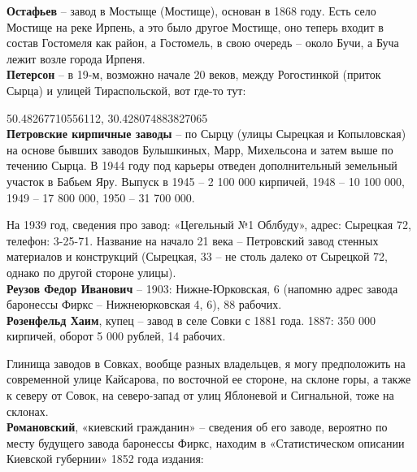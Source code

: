 \noindent\textbf{Остафьев} – завод в Мостыще (Мостище), основан в 1868 году. Есть село Мостище на реке Ирпень, а это было другое Мостище, оно теперь входит в состав Гостомеля как район, а Гостомель, в свою очередь – около Бучи, а Буча лежит возле города Ирпеня.\\


\noindent\textbf{Петерсон} – в 19-м, возможно начале 20 веков, между Рогостинкой (приток Сырца) и улицей Тираспольской, вот где-то тут:

50.48267710556112, 30.428074883827065\\

\noindent\textbf{Петровские кирпичные заводы} – по Сырцу (улицы Сырецкая и Копыловская) на основе бывших заводов Булышкиных, Марр, Михельсона и затем выше по течению Сырца. В 1944 году под карьеры отведен дополнительный земельный участок в Бабьем Яру. Выпуск в 1945 – 2 100 000 кирпичей, 1948 – 10 100 000, 1949 – 17 800 000, 1950 – 31 700 000. 

На 1939 год, сведения про завод: «Цегельный №1 Облбуду», адрес: Сырецкая 72, телефон: 3-25-71. Название на начало 21 века – Петровский завод стенных материалов и конструкций (Сырецкая, 33 – не столь далеко от Сырецкой 72, однако по другой стороне улицы).\\ 

\noindent\textbf{Реузов Федор Иванович} – 1903: Нижне-Юрковская, 6 (напомню адрес завода баронессы Фиркс – Нижнеюрковская 4, 6), 88 рабочих.\\

\noindent\textbf{Розенфельд Хаим}, купец – завод в селе Совки с 1881 года. 1887: 350 000 кирпичей, оборот 5 000 рублей, 14 рабочих.

Глинища заводов в Совках, вообще разных владельцев, я могу предположить на современной улице Кайсарова, по восточной ее стороне, на склоне горы, а также к северу от Совок, на северо-запад от улиц Яблоневой и Сигнальной, тоже на склонах.\\

\noindent\textbf{Романовский}, «киевский гражданин» – сведения об его заводе, вероятно по месту будущего завода баронессы Фиркс, находим в «Статистическом описании Киевской губернии»\cite{fundstat} 1852 года издания:

